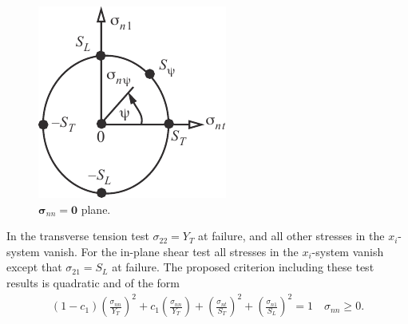 \documentclass{AeroStructure-ERJohnson}
\begin{document}
\begin{figure}
\vspace{-10pt}
\includegraphics{Figure_9-2.pdf}
\caption{$\boldsymbol{\sigma}_{nn}= {\textbf{0}}$ plane. \label{fig9.2}}
\end{figure}

\vspace*{-1pc}

\noindent In the transverse tension test $\sigma_\textit{22} = Y_T$ at failure, and all other stresses in the $x_i$-system vanish. For the in-plane shear test all stresses in the $x_i$-system vanish except that $\sigma_\textit{21} = S_L$ at failure. The proposed criterion including these test results is quadratic and of the form
\begin{align}\label{eq9.4}
\left(1-c_{1}\right)\left(\frac{\sigma_{n n}}{Y_{T}}\right)^{2}+c_{1}\left(\frac{\sigma_{n n}}{Y_{T}}\right)+\left(\frac{\sigma_{n t}}{S_{T}}\right)^{2}+\left(\frac{\sigma_{n 1}}{S_{L}}\right)^{2}=1 \quad \sigma_{n n} \geq 0.
\end{align}

\vspace*{-1pc}
\end{document}
